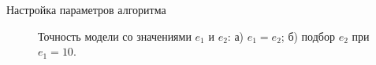 \documentclass[12pt, aspectratio=169]{beamer}
\begin{document}
\begin{frame}{Настройка параметров алгоритма}

\fontsize{8}{5}\selectfont
    \begin{figure}
    \caption*{\fontsize{11}{5}\selectfont
    Точность модели со значениями $e_1$ и $e_2$: а) $e_1 = e_2$; б) подбор $e_2$ при $e_1 = 10$.}
    \vspace{-0.2 cm}
    \begin{minipage}[h]{0.45\linewidth}
    \end{minipage}
    \begin{minipage}[h]{0.45\linewidth}
    \center{
}
\end{minipage}
\end{figure}
\end{frame}
\end{document}
